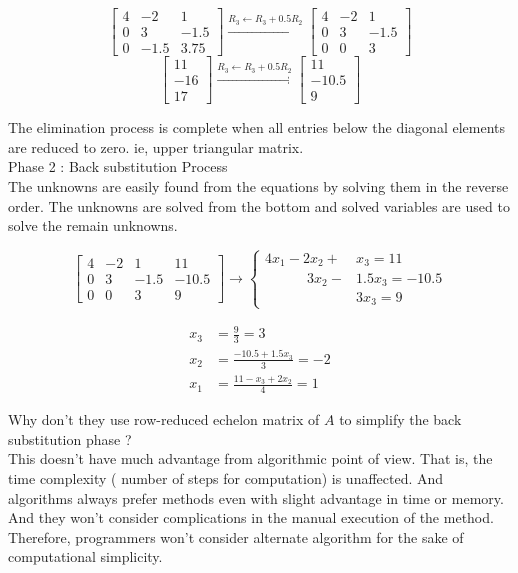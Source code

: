 	\[ \begin{bmatrix} 4 & -2 & 1 \\ 0 & 3 & -1.5 \\ 0 & -1.5 & 3.75 \end{bmatrix} \xrightarrow{R_3 \leftarrow R_3 + 0.5R_2} \begin{bmatrix} 4 & -2 & 1 \\ 0 & 3 & -1.5 \\ 0 & 0 & 3 \end{bmatrix} \]
	\[ \begin{bmatrix} 11 \\ -16 \\ 17 \end{bmatrix}  \xrightarrow{R_3 \leftarrow R_3 + 0.5R_2} \begin{bmatrix} 11 \\ -10.5 \\ 9 \end{bmatrix} \]

	The elimination process is complete when all entries below the diagonal elements are reduced to zero.
	ie, upper triangular matrix.\\

	Phase 2 : Back substitution Process\\

	The unknowns are easily found from the equations by solving them in the reverse order.
	The unknowns are solved from the bottom and solved variables are used to solve the remain unknowns.

	\[ \begin{bmatrix} 4 & -2 & 1 & 11 \\ 0 & 3 & -1.5 & -10.5 \\ 0 & 0 & 3 & 9 \end{bmatrix} \to \begin{cases} 4x_1 - 2x_2 + &x_3  = 11 \\ \quad \qquad 3x_2 - &1.5x_3  = -10.5 \\  &3x_3 = 9 \end{cases}  \]

	\begin{align*} x_3 & = \frac{9}{3} = 3 \\  x_2 & = \frac{-10.5 + 1.5x_3}{3} = -2 \\ x_1 & = \frac{11-x_3+2x_2}{4}=1 \end{align*}

\begin{remark}
\begin{commentary}
		Why don't they use row-reduced echelon matrix of $A$ to simplify the back substitution phase ?\\

		This doesn't have much advantage from algorithmic point of view.
		That is, the time complexity ( number of steps for computation) is unaffected.
		And algorithms always prefer methods even with slight advantage in time or memory.
		And they won't consider complications in the manual execution of the method.
		Therefore, programmers won't consider alternate algorithm for the sake of computational simplicity.
\end{commentary}
\end{remark}

